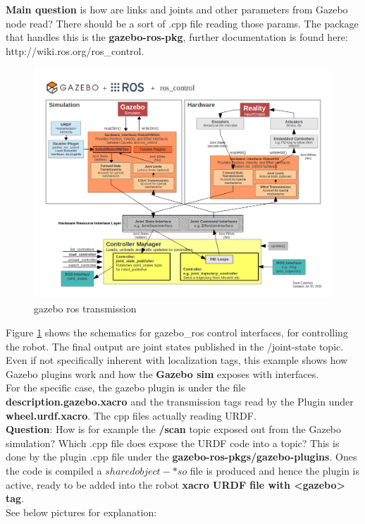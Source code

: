 \documentclass[11pt,a4paper]{article}
\begin{document}
\textbf{Main question} is how are links and joints and other parameters from Gazebo node read? There should be a sort of .cpp file reading those params. The package that handles this is the \textbf{gazebo-ros-pkg}, further documentation is found here: http://wiki.ros.org/ros{\_}control. \\

\begin{figure}[H]
	\center
	\includegraphics[width=.9\textwidth]{figures/gazebo_ros_transmission.png}
	\caption{gazebo ros transmission}
	\label{fig:ros_control}
\end{figure}

Figure \ref{fig:ros_control} shows the schematics for gazebo{\_}ros control interfaces, for controlling the robot. The final output are joint states published in the /joint-state topic. Even if not specifically inherent with localization tags, this example shows how Gazebo plugins work and how the \textbf{Gazebo sim} exposes with interfaces. \\
For the specific case, the gazebo plugin is under the file \textbf{description.gazebo.xacro} and the transmission tags read by the Plugin under \textbf{wheel.urdf.xacro}. The cpp files actually reading URDF. \\
\textbf{Question}: How is for example the \textbf{/scan} topic exposed out from the Gazebo simulation? Which .cpp file does expose the URDF code into a topic? This is done by the plugin .cpp file under the \textbf{gazebo-ros-pkgs/gazebo-plugins}. Ones the code is compiled a $shared object-*so$ file is produced and hence the plugin is active, ready to be added into the robot \textbf{xacro URDF file with <gazebo> tag}. \\
See below pictures for explanation:
\end{document}
